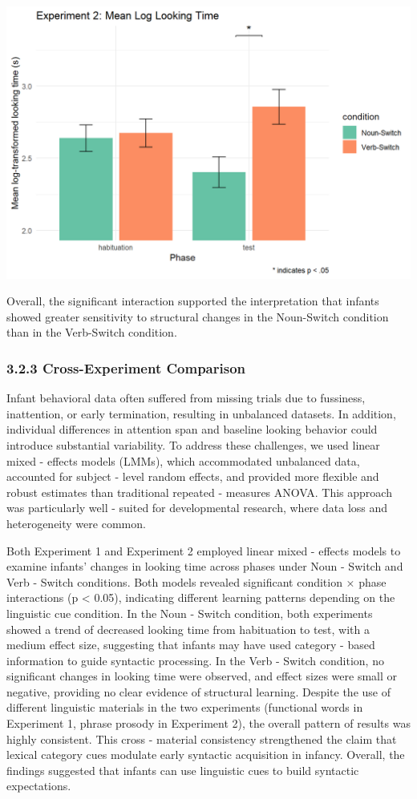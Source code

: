 \documentclass[
  man]{apa6}
\begin{document}
\includegraphics{pic/Exp2.png}

Overall, the significant interaction supported the interpretation that infants showed greater sensitivity to structural changes in the Noun-Switch condition than in the Verb-Switch condition.

\subsubsection{3.2.3 Cross-Experiment Comparison}\label{cross-experiment-comparison}

Infant behavioral data often suffered from missing trials due to fussiness, inattention, or early termination, resulting in unbalanced datasets. In addition, individual differences in attention span and baseline looking behavior could introduce substantial variability. To address these challenges, we used linear mixed - effects models (LMMs), which accommodated unbalanced data, accounted for subject - level random effects, and provided more flexible and robust estimates than traditional repeated - measures ANOVA. This approach was particularly well - suited for developmental research, where data loss and heterogeneity were common.

Both Experiment 1 and Experiment 2 employed linear mixed - effects models to examine infants' changes in looking time across phases under Noun - Switch and Verb - Switch conditions. Both models revealed significant condition × phase interactions (p \textless{} 0.05), indicating different learning patterns depending on the linguistic cue condition.
In the Noun - Switch condition, both experiments showed a trend of decreased looking time from habituation to test, with a medium effect size, suggesting that infants may have used category - based information to guide syntactic processing. In the Verb - Switch condition, no significant changes in looking time were observed, and effect sizes were small or negative, providing no clear evidence of structural learning.
Despite the use of different linguistic materials in the two experiments (functional words in Experiment 1, phrase prosody in Experiment 2), the overall pattern of results was highly consistent. This cross - material consistency strengthened the claim that lexical category cues modulate early syntactic acquisition in infancy. Overall, the findings suggested that infants can use linguistic cues to build syntactic expectations.
\end{document}
